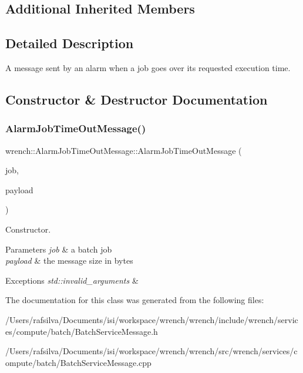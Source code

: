 \subsection*{Additional Inherited Members}


\subsection{Detailed Description}
A message sent by an alarm when a job goes over its requested execution time. 

\subsection{Constructor \& Destructor Documentation}
\mbox{\label{classwrench_1_1_alarm_job_time_out_message_af50834d57804dae7762206580fe891b3}} 
\subsubsection{\texorpdfstring{Alarm\+Job\+Time\+Out\+Message()}{AlarmJobTimeOutMessage()}}
{\footnotesize\ttfamily wrench\+::\+Alarm\+Job\+Time\+Out\+Message\+::\+Alarm\+Job\+Time\+Out\+Message (\begin{DoxyParamCaption}\item[{\hyperlink{classwrench_1_1_batch_job}{Batch\+Job} $\ast$}]{job,  }\item[{double}]{payload }\end{DoxyParamCaption})}



Constructor. 


\begin{DoxyParams}{Parameters}
{\em job} & a batch job \\
\hline
{\em payload} & the message size in bytes\\
\hline
\end{DoxyParams}

\begin{DoxyExceptions}{Exceptions}
{\em std\+::invalid\+\_\+arguments} & \\
\hline
\end{DoxyExceptions}


The documentation for this class was generated from the following files\+:\begin{DoxyCompactItemize}
\item 
/\+Users/rafsilva/\+Documents/isi/workspace/wrench/wrench/include/wrench/services/compute/batch/Batch\+Service\+Message.\+h\item 
/\+Users/rafsilva/\+Documents/isi/workspace/wrench/wrench/src/wrench/services/compute/batch/Batch\+Service\+Message.\+cpp\end{DoxyCompactItemize}
